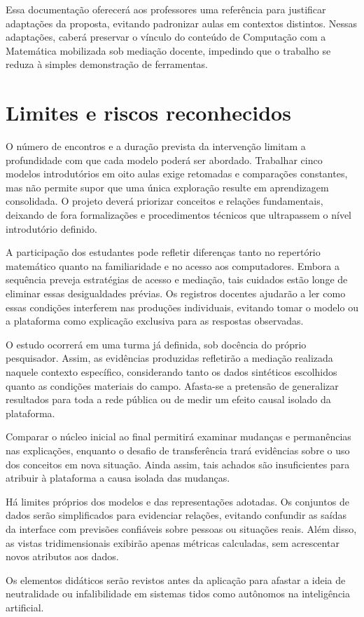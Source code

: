 Essa documentação oferecerá aos professores uma referência para justificar adaptações da proposta, evitando padronizar aulas em contextos distintos. Nessas adaptações, caberá preservar o vínculo do conteúdo de Computação com a Matemática mobilizada sob mediação docente, impedindo que o trabalho se reduza à simples demonstração de ferramentas.

\section{Limites e riscos reconhecidos}

O número de encontros e a duração prevista da intervenção limitam a profundidade com que cada modelo poderá ser abordado. Trabalhar cinco modelos introdutórios em oito aulas exige retomadas e comparações constantes, mas não permite supor que uma única exploração resulte em aprendizagem consolidada. O projeto deverá priorizar conceitos e relações fundamentais, deixando de fora formalizações e procedimentos técnicos que ultrapassem o nível introdutório definido.

A participação dos estudantes pode refletir diferenças tanto no repertório matemático quanto na familiaridade e no acesso aos computadores. Embora a sequência preveja estratégias de acesso e mediação, tais cuidados estão longe de eliminar essas desigualdades prévias. Os registros docentes ajudarão a ler como essas condições interferem nas produções individuais, evitando tomar o modelo ou a plataforma como explicação exclusiva para as respostas observadas.

O estudo ocorrerá em uma turma já definida, sob docência do próprio pesquisador. Assim, as evidências produzidas refletirão a mediação realizada naquele contexto específico, considerando tanto os dados sintéticos escolhidos quanto as condições materiais do campo. Afasta-se a pretensão de generalizar resultados para toda a rede pública ou de medir um efeito causal isolado da plataforma.

Comparar o núcleo inicial ao final permitirá examinar mudanças e permanências nas explicações, enquanto o desafio de transferência trará evidências sobre o uso dos conceitos em nova situação. Ainda assim, tais achados são insuficientes para atribuir à plataforma a causa isolada das mudanças.

Há limites próprios dos modelos e das representações adotadas. Os conjuntos de dados serão simplificados para evidenciar relações, evitando confundir as saídas da interface com previsões confiáveis sobre pessoas ou situações reais. Além disso, as vistas tridimensionais exibirão apenas métricas calculadas, sem acrescentar novos atributos aos dados.

Os elementos didáticos serão revistos antes da aplicação para afastar a ideia de neutralidade ou infalibilidade em sistemas tidos como autônomos na inteligência artificial.
